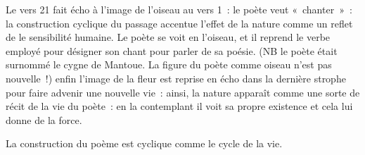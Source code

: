 {\bigskip

Le vers 21 fait écho à l'image de l'oiseau au vers 1~: le poète veut «~chanter~»~: la construction
cyclique du passage accentue l'effet de la nature comme un reflet de le sensibilité humaine. Le
poète se voit en l'oiseau, et il reprend le verbe employé pour désigner son chant pour parler de
sa poésie. (NB le poète  était surnommé le cygne de Mantoue. La figure du poète comme
oiseau n'est pas nouvelle~!) enfin l'image de la fleur est reprise en écho dans la dernière strophe pour faire advenir une nouvelle vie~: ainsi, la nature apparaît comme une sorte de récit de la vie
du poète~: en la contemplant il voit sa propre existence et cela lui donne de la force.

\bigskip

La construction du poème est cyclique comme le cycle de la vie.}%
